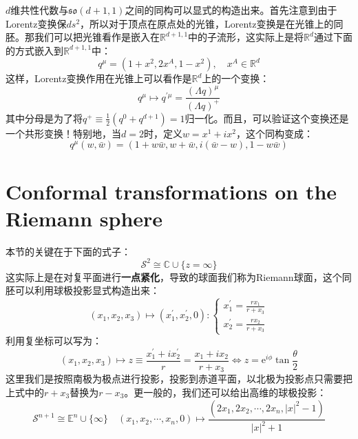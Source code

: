 	$d$维共性代数与$\mathfrak{so}(d+1,1)$之间的同构可以显式的构造出来\cite{Rychkov:2016iqz,Hugh}。首先注意到由于Lorentz变换保$ds^2$，所以对于顶点在原点处的光锥，Lorentz变换是在光锥上的同胚。那我们可以把光锥看作是嵌入在$\mathbb{R}^{d+1,1}$中的子流形，这实际上是将$\mathbb{R}^{d}$通过下面的方式嵌入到$\mathbb{R}^{d+1,1}$中：
	\begin{equation}
		q^{\mu}=(1+x^2,2x^A,1-x^2),\quad x^A\in\mathbb{R}^d
	\end{equation}
	这样，Lorentz变换作用在光锥上可以看作是$\mathbb{R}^d$上的一个变换：
	\begin{equation}
		q^\mu\mapsto q^{\prime\mu}=\frac{(\Lambda q)^\mu}{(\Lambda q)^+}
	\end{equation}
	其中分母是为了将$q^+\equiv\frac{1}{2}\left(q^0+q^{d+1}\right)=1$归一化。而且，可以验证这个变换还是一个共形变换！特别地，当$d=2$时，定义$w=x^1+ix^2$，这个同构变成：
	\begin{equation}
		q^\mu(w,\bar w)=(1+w\bar w,w+\bar w,i(\bar w-w),1-w\bar w)
	\end{equation}
\section{Conformal transformations on the Riemann sphere}
本节的关键在于下面的式子：
\begin{equation}
	\mathcal{S}^2\cong\mathbb{C}\cup\{z=\infty\}
\end{equation}
这实际上是在对复平面进行\textbf{一点紧化}，导致的球面我们称为Riemann球面，这个同胚可以利用球极投影显式构造出来：
\begin{equation}
	(x_1,x_2,x_3)\mapsto(x_1^{\prime},x_2^{\prime},0):\begin{cases}
		x_1^{\prime}=\frac{rx_1}{r+x_3}\\
		x_2^{\prime}=\frac{rx_2}{r+x_3}
	\end{cases}
\end{equation}
利用复坐标可以写为：
\begin{equation}
	(x_1,x_2,x_3)\mapsto z\equiv\frac{x_1^{\prime}+ix_2^{\prime}}{r}=\frac{x_1+ix_2}{r+x_3}\iff z=\mathrm{e}^{i\phi}\tan\frac{\theta}{2}
\end{equation}
这里我们是按照南极为极点进行投影，投影到赤道平面，以北极为投影点只需要把上式中的$r+x_3$替换为$r-x_3$。更一般的，我们还可以给出高维的球极投影：
\begin{equation}
	\mathcal{S}^{n+1}\cong{\mathbb{E}^{n}\cup\{\infty\}}
	\quad(x_1, x_2, \cdots, x_n,0) \mapsto\frac{(2x_1, 2x_2, \cdots, 2x_n, |x|^2 - 1)}{|x|^2 + 1}
\end{equation}

